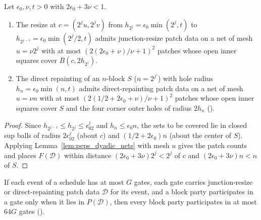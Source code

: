 \begin{lemma}
    \label{thm:peps_dyadic_patch_rewrite_nets}
    \leanok
    Let $\epsilon_0,\nu,t>0$ with $2\epsilon_0+3\nu<1$.
    \begin{enumerate}
        \item The resize at $c=(2^ju,2^jv)$ from $h_{2^j}=\epsilon_0\min(2^j,t)$ to
              $h_{2^{j-1}}=\epsilon_0\min(2^j/2,t)$ admits junction-resize patch
              data on a net of mesh $u=\nu2^j$ with at most
              $(2(2\epsilon_0+\nu)/\nu+1)^2$ patches whose open inner squares cover
              $\overline B(c,2h_{2^j})$.
        \item The direct repainting of an $n$-block $S$ ($n=2^{j'}$) with hole
              radius $h_n=\epsilon_0\min(n,t)$ admits direct-repainting patch data
              on a net of mesh $u=\nu n$ with at most
              $(2(1/2+2\epsilon_0+\nu)/\nu+1)^2$ patches whose open inner squares
              cover $S$ and the four corner outer holes of radius $2h_n$
              (\cite[Section~7, lines 500--541]{OpenAI2026PolynomialPEPS}).
    \end{enumerate}
\end{lemma}

\begin{proof}\leanok
    Since $h_{2^{j-1}}\le h_{2^j}\le\epsilon_02^j$ and $h_n\le\epsilon_0n$, the
    sets to be covered lie in closed sup balls of radius $2\epsilon_02^j$ (about
    $c$) and $(1/2+2\epsilon_0)n$ (about the center of $S$). Applying
    Lemma~\ref{lem:peps_dyadic_nets} with mesh $u$ gives the patch counts and
    places $F(\mathcal D)$ within distance $(2\epsilon_0+3\nu)2^j<2^j$ of $c$ and
    $(2\epsilon_0+3\nu)n<n$ of $S$.
\end{proof}

\begin{lemma}
    \label{thm:peps_dyadic_patch_rewrite_lifetime}
    \leanok
    If each event of a schedule has at most $G$ gates, each gate carries
    junction-resize or direct-repainting patch data $\mathcal D$ for its event, and
    a block party participates in a gate only when it lies in $P(\mathcal D)$,
    then every block party participates in at most $64G$ gates
    (\cite[Proposition~7.1, item~2]{OpenAI2026PolynomialPEPS}).
\end{lemma}

